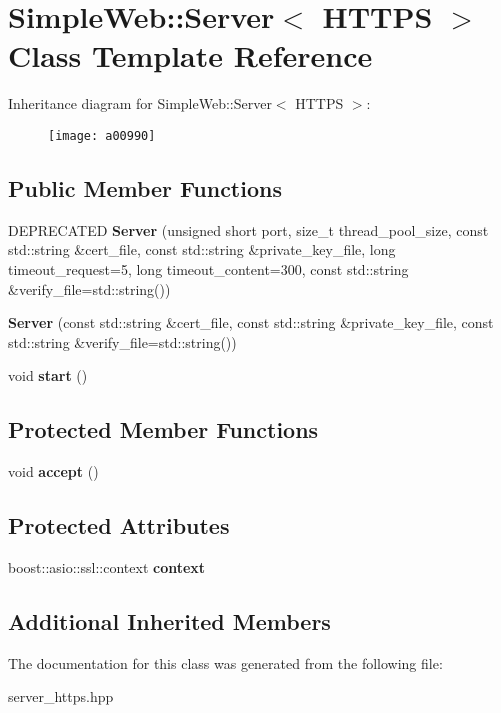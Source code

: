 \hypertarget{a00990}{}\section{Simple\+Web\+:\+:Server$<$ H\+T\+T\+PS $>$ Class Template Reference}
\label{a00990}
Inheritance diagram for Simple\+Web\+:\+:Server$<$ H\+T\+T\+PS $>$\+:\begin{figure}[H]
\begin{center}
\leavevmode
\texttt{[image: a00990]}
\end{center}
\end{figure}
\subsection*{Public Member Functions}
\begin{DoxyCompactItemize}
\item 
\mbox{\label{a00990_a1a5530e96cd973de3dc987034ca61b54}} 
D\+E\+P\+R\+E\+C\+A\+T\+ED {\bfseries Server} (unsigned short port, size\+\_\+t thread\+\_\+pool\+\_\+size, const std\+::string \&cert\+\_\+file, const std\+::string \&private\+\_\+key\+\_\+file, long timeout\+\_\+request=5, long timeout\+\_\+content=300, const std\+::string \&verify\+\_\+file=std\+::string())
\item 
\mbox{\label{a00990_a15bb179287dfaa18da16b8877174e8d6}} 
{\bfseries Server} (const std\+::string \&cert\+\_\+file, const std\+::string \&private\+\_\+key\+\_\+file, const std\+::string \&verify\+\_\+file=std\+::string())
\item 
\mbox{\label{a00990_a6a740b3fdbbbf178f540e27942cc93fc}} 
void {\bfseries start} ()
\end{DoxyCompactItemize}
\subsection*{Protected Member Functions}
\begin{DoxyCompactItemize}
\item 
\mbox{\label{a00990_af722d2884eafafada7073feb7793c422}} 
void {\bfseries accept} ()
\end{DoxyCompactItemize}
\subsection*{Protected Attributes}
\begin{DoxyCompactItemize}
\item 
\mbox{\label{a00990_ade0b1e6f826fd76ba6c6253d352fd93c}} 
boost\+::asio\+::ssl\+::context {\bfseries context}
\end{DoxyCompactItemize}
\subsection*{Additional Inherited Members}


The documentation for this class was generated from the following file\+:\begin{DoxyCompactItemize}
\item 
server\+\_\+https.\+hpp\end{DoxyCompactItemize}
